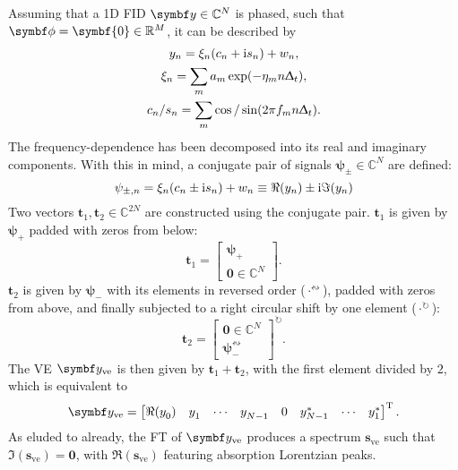 Assuming that a \ac{1D} \ac{FID} $\by \in \mathbb{C}^N$ is phased, such that
$\bdphi = \symbf{0} \in \mathbb{R}^M$, it can be described by
\begin{subequations}
    \begin{gather}
        y_n = \xi_n (c_n + \mathrm{i} s_n) + w_n,\\
        \xi_n = \sum_m a_m \exp(-\eta_m n \Updelta_t),\\
        c_n / s_n = \sum_m \cos / \sin(2 \pi f_m n \Updelta_t).
    \end{gather}
\end{subequations}
The frequency-dependence has been decomposed into its real and imaginary
components. With this in mind, a conjugate pair of signals $\symbf{\psi}_{\pm}
\in \mathbb{C}^N$ are defined:
\begin{equation}
    \psi_{\pm,n} = \xi_n (c_n \pm \mathrm{i} s_n) + w_n \equiv \Re(y_n) \pm \mathrm{i} \Im(y_n)
\end{equation}
Two vectors $\symbf{t}_{1}, \symbf{t}_2 \in \mathbb{C}^{2N}$
are constructed using the conjugate pair.
$\symbf{t}_1$ is given by $\symbf{\psi}_+$ padded with zeros from below:
    \begin{equation}
        \symbf{t}_1 = \begin{bmatrix}
            \symbf{\psi}_+ \\ \symbf{0} \in \mathbb{C}^{N}
        \end{bmatrix}.
    \end{equation}
$\symbf{t}_2$ is given by $\symbf{\psi}_{-}$ with its elements in
    reversed order ($\cdot^{{\leftrightsquigarrow}}$), padded with zeros
    from above, and finally subjected to a right circular shift by one
    element ($\cdot^{{\circlearrowright}}$):
    \begin{equation}
        \symbf{t}_2 = \begin{bmatrix}
            \symbf{0} \in \mathbb{C}^{N} \\ \symbf{\psi}_-^{{\leftrightsquigarrow}}
    \end{bmatrix}^{{\circlearrowright}}.
   \end{equation}
The \ac{VE} $\by_{\text{ve}}$ is then given by $\symbf{t}_1 +
\symbf{t}_2$, with the first element divided by $2$, which is equivalent to
\begin{equation}
    \by_{\text{ve}} =
    \begin{bmatrix}
        \Re(y_0^{\vphantom{*}}) &
        y_1^{\vphantom{*}} &
        \cdots &
        y_{N-1}^{\vphantom{*}} &
        0 &
        y_{N-1}^* &
        \cdots &
        y_1^*
    \end{bmatrix}\T.
\end{equation}
As eluded to already, the \ac{FT} of $\by_{\text{ve}}$ produces a spectrum
$\symbf{s}_{\text{ve}}$ such that $\Im\left(\symbf{s}_{\text{ve}}\right) =
\symbf{0}$, with $\Re\left(\symbf{s}_{\text{ve}}\right)$ featuring absorption
Lorentzian peaks.

